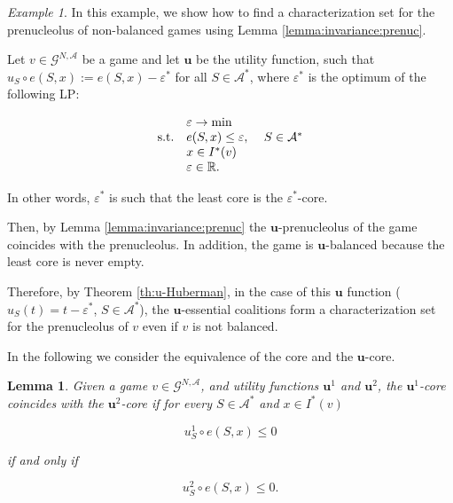 \documentclass[a4paper,12pt]{article}
\newtheorem{lemma}[theorem]{Lemma}
\theoremstyle{definition}
\theoremstyle{remark}
\newtheorem{example}[theorem]{Example}
\begin{document}
\begin{example}
In this example, we show how to find a characterization set for the prenucleolus of non-balanced games using Lemma \ref{lemma:invariance:prenuc}.

Let $v\in \mathcal{G}^{N, \mathcal{A}}$ be a game and let $\mathbf{u}$ be the utility function, such that $u_S \circ e(S, x) := e(S, x) - \varepsilon^*$ for all $S\in \mathcal{A}^*$, where $\varepsilon ^*$ is the optimum of the following LP:

\begin{equation}
\begin{array}{llr}
& \varepsilon \to \min & \\
\textup{s.t.} &  e(S, x) \leq \varepsilon, & \ S \in \mathcal{A}^\ast \\
& x \in I^\ast (v) &  \\
& \varepsilon \in \mathbb{R}. & 
\end{array}
\end{equation}

In other words, $\varepsilon ^*$ is such that the least core is the $\varepsilon^*$-core.

Then, by Lemma \ref{lemma:invariance:prenuc} the $\mathbf{u}$-prenucleolus of the game coincides with the prenucleolus. In addition, the game is $\mathbf{u}$-balanced because the least core is never empty.

Therefore, by Theorem \ref{th:u-Huberman}, in the case of this $\mathbf{u}$ function ($u_S (t) = t - \varepsilon^\ast$, $S \in \mathcal{A}^\ast$), the $\mathbf{u}$-essential coalitions form a characterization set for the prenucleolus of $v$ even if $v$ is not balanced.
\end{example}

\bigskip

In the following we consider the equivalence of the core and the $\mathbf{u}$-core.

\begin{lemma}\label{lemma:invariance:core}
Given a game $v \in \mathcal{G}^{N,\mathcal{A}}$, and utility functions $\mathbf{u}^1$ and $\mathbf{u}^2$, the $\mathbf{u}^1$-core coincides with the $\mathbf{u}^2$-core if for every $S\in \mathcal{A}^*$ and $x\in I^*(v)$

\begin{equation}\label{eq:incariance:core1}
u_S^1 \circ e(S, x) \leq 0
\end{equation}

\noindent if and only if

\begin{equation}\label{eq:incariance:core2}
u_S^2 \circ e(S, x) \leq 0 .
\end{equation}
\end{lemma}
\end{document}
